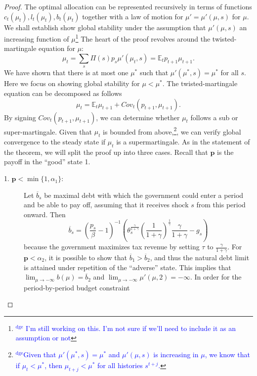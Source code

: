 \documentclass[12pt]{article}
\newcommand{\dge}[1]{\textcolor{blue}{$^{\textrm{dge}}${#1}}}
\newcommand{\tjs}[1]{\textcolor{red}{$^{\textrm{tjs}}${#1}}}
\newcommand{\EE}{\mathbb E}
\begin{document}
\begin{proof}
The optimal allocation can be represented recursively in terms of  functions $c_t(\mu_t),l_t(\mu_t), b_t(\mu_t)$ together  with a law of motion for $\mu' = \mu'(\mu,s)$ for $\mu$.
We shall establish show global stability under the assumption that $\mu'(\mu,s)$ an increasing function of $\mu$\footnote{\dge{ I'm still working on this.  I'm not sure if we'll need to include it as an assumption or not}}  The heart of the proof revolves around the twisted-martingale equation for $\mu$:
\[
	\mu_t = \sum_s \Pi(s) p_s \mu'(\mu_t,s) = \EE_t p_{t+1}\mu_{t+1}.
\]  We have shown that there is at most one $\mu^*$ such that $\mu'(\mu^*,s) = \mu^*$ for all $s$.  Here we focus on showing global stability for $\mu < \mu^*$. The twisted-martingale equation can be decomposed as follows
\[
	\mu_t = \EE_t \mu_{t+1}+Cov_t(p_{t+1},\mu_{t+1}).
\] By signing $Cov_t(p_{t+1},\mu_{t+1})$,  we can determine whether $\mu_t$ follows a sub or super-martingale.  Given that $\mu_t$ is bounded from above,\footnote{\dge{Given that $\mu'(\mu^*,s) = \mu^*$ and $\mu'(\mu,s)$ is increasing in $\mu$,  we know that if $\mu_t < \mu^*$, then $\mu_{t+j} < \mu^*$ for all histories $s^{t+j}$.}}, we can verify global convergence to the steady state if $\mu_t$ is a supermartingale.  As in the statement of the theorem, we will split the proof up into three cases. Recall that $\bm p$ is the payoff in the ``good'' state 1.
\begin{description}
	\item[1. $\bm p < \min\{1,\alpha_1\}$:]  Let $\overline b_s$ be maximal debt with which the government %
 could enter a period and be able to pay off, assuming that  it  receives shock $s$ from this period onward. Then
	\[
	\overline b_s = \left(\frac{p_s}{\beta}-1\right)^{-1}\left(\theta_s^\frac{\gamma}{1+\gamma}\left(\frac1{1+\gamma}\right)^\frac1\gamma\frac\gamma{1+\gamma}-g_s\right)
	\] because the government maximizes tax revenue  by setting %
 $\tau$ to $\frac\gamma{1+\gamma}$. %
 For $\bm p <\alpha_2$, it is possible to show that $\overline b_1 > \overline b_2$, and thus the natural debt limit is attained under repetition of the ``adverse'' state.  This implies that $\lim_{\mu\rightarrow-\infty} b(\mu) = \overline b_2$ and  $\lim_{\mu\rightarrow-\infty} \mu'(\mu,2) = -\infty$.  In order for the period-by-period budget constraint

\end{description}
\end{proof}
\end{document}
